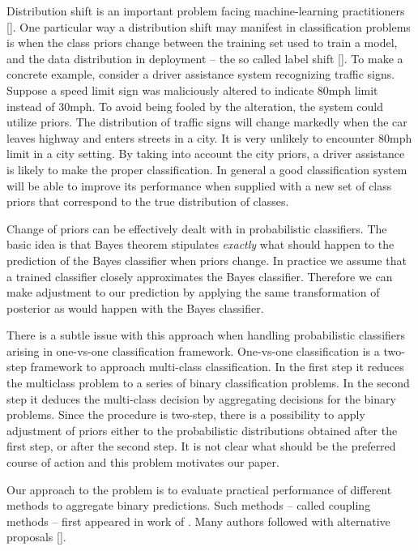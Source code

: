 \documentclass[twoside,11pt]{article}
\begin{document}
Distribution shift is an important problem facing machine-learning practitioners  [\cite{zhang2023dive, sugiyama2007covariate}].  One particular way a distribution shift may manifest in classification problems  is when the class priors change between the training set used to train a model, and the data distribution in deployment -- the so called label shift [\cite{vsipka2022hitchhiker,lipton2018detecting}]. To make a concrete example, consider a driver assistance system recognizing traffic signs. Suppose a speed limit sign was maliciously altered to indicate 80mph limit instead of 30mph. To avoid being fooled by the alteration, the system could utilize priors. The distribution of traffic signs will change markedly when the car leaves highway and enters streets in a city. It is very unlikely to encounter 80mph limit in a city setting. By taking into account the city priors, a driver assistance is likely to make the proper classification. In general a good classification system will be able to improve its performance when supplied with a new set of class priors that correspond to the true distribution of classes. 

Change of priors can be effectively dealt with in probabilistic classifiers. The basic idea is that Bayes theorem stipulates \emph{exactly} what should happen  to the prediction of the  Bayes classifier when priors change.  In practice we assume that a trained classifier closely approximates the Bayes classifier. Therefore we can make adjustment to our prediction by applying the same transformation of posterior as would happen with the Bayes classifier. 

There is a subtle issue with this approach  when handling probabilistic classifiers arising in one-vs-one classification framework.   One-vs-one classification is a two-step framework to approach  multi-class classification. In the first step it reduces the multiclass problem to a series of binary classification problems. In the second step it deduces the multi-class decision by aggregating decisions for the binary problems. Since the procedure is two-step, there is a possibility to apply adjustment of priors either to the probabilistic distributions obtained after the first step, or after the second step. It is not clear what should be the preferred course of action and this problem motivates our paper.


Our approach to the problem is to evaluate practical performance of different methods to aggregate binary predictions. Such methods -- called coupling methods -- first appeared in work of \cite{refregier1991probabilistic}. Many authors followed with alternative proposals [\cite{price1994pairwise, hastie1998classification,  zahorian1999partitioned, wu2004probability, vsuch2015new, vsuch2016bayes}].
\end{document}
